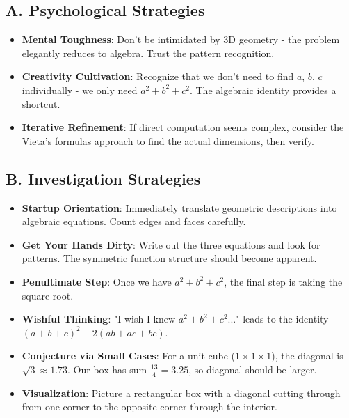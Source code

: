 \documentclass[12pt]{article}
\begin{document}
\begin{strategicbox}
\subsection*{A. Psychological Strategies}
\begin{itemize}[leftmargin=*]
    \item \textbf{Mental Toughness}: Don't be intimidated by 3D geometry - the problem elegantly reduces to algebra. Trust the pattern recognition.
    \item \textbf{Creativity Cultivation}: Recognize that we don't need to find $a$, $b$, $c$ individually - we only need $a^2+b^2+c^2$. The algebraic identity provides a shortcut.
    \item \textbf{Iterative Refinement}: If direct computation seems complex, consider the Vieta's formulas approach to find the actual dimensions, then verify.
\end{itemize}

\subsection*{B. Investigation Strategies}
\begin{itemize}[leftmargin=*]
    \item \textbf{Startup Orientation}: Immediately translate geometric descriptions into algebraic equations. Count edges and faces carefully.
    \item \textbf{Get Your Hands Dirty}: Write out the three equations and look for patterns. The symmetric function structure should become apparent.
    \item \textbf{Penultimate Step}: Once we have $a^2+b^2+c^2$, the final step is taking the square root.
    \item \textbf{Wishful Thinking}: "I wish I knew $a^2+b^2+c^2$..." leads to the identity $(a+b+c)^2 - 2(ab+ac+bc)$.
    \item \textbf{Conjecture via Small Cases}: For a unit cube ($1 \times 1 \times 1$), the diagonal is $\sqrt{3} \approx 1.73$. Our box has sum $\frac{13}{4} = 3.25$, so diagonal should be larger.
    \item \textbf{Visualization}: Picture a rectangular box with a diagonal cutting through from one corner to the opposite corner through the interior.
\end{itemize}


\end{strategicbox}
\end{document}
